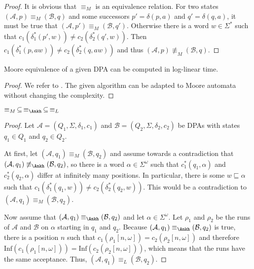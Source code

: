 \begin{proof}
	It is obvious that $\equiv_M$ is an equivalence relation. For two states $(\mathcal{A}, p) \equiv_M (\mathcal{B}, q)$ and some successors $p' = \delta(p, a)$ and $q' = \delta(q, a)$, it must be true that $(\mathcal{A}, p') \equiv_M (\mathcal{B}, q')$. Otherwise there is a word $w \in \Sigma^*$ such that $c_1(\delta_1^*(p', w)) \neq c_2(\delta_2^*(q', w))$. Then $c_1(\delta_1^*(p, aw)) \neq c_2(\delta_2^*(q, aw))$ and thus $(\mathcal{A}, p) \not\equiv_M (\mathcal{B}, q)$.
\end{proof}

\begin{lem}
	Moore equivalence of a given DPA can be computed in log-linear time.
\end{lem}

\begin{proof}
	We refer to \cite{Hopcroft1971}. The given algorithm can be adapted to Moore automata without changing the complexity.
\end{proof}


\vspace{10pt}

\begin{theorem}
	$\equiv_M \,\subseteq\, \equiv_\text{\Ankh} \,\subseteq\, \equiv_L$
	\label{thm:general:M_subs_Ankh_subs_L}
\end{theorem}

\begin{proof}
	Let $\mathcal{A} = (Q_1, \Sigma, \delta_1, c_1)$ and $\mathcal{B} = (Q_2, \Sigma, \delta_2, c_2)$ be DPAs with states $q_1 \in Q_1$ and $q_2 \in Q_2$. 
	
	At first, let $(\mathcal{A}, q_1) \equiv_M (\mathcal{B}, q_2)$ and assume towards a contradiction that $(\mathcal{A}, q_1) \not\equiv_\text{\Ankh} (\mathcal{B}, q_2)$, so there is a word $\alpha \in \Sigma^\omega$ such that $c_1^*(q_1, \alpha)$ and $c_2^*(q_2, \alpha)$ differ at infinitely many positions. In particular, there is some $w \sqsubseteq \alpha$ such that $c_1(\delta_1^*(q_1, w)) \neq c_2(\delta_2^*(q_2, w))$. This would be a contradiction to $(\mathcal{A}, q_1) \equiv_M (\mathcal{B}, q_2)$.
	
	Now assume that $(\mathcal{A}, q_1) \equiv_\text{\Ankh} (\mathcal{B}, q_2)$ and let $\alpha \in \Sigma^\omega$. Let $\rho_1$ and $\rho_2$ be the runs of $\mathcal{A}$ and $\mathcal{B}$ on $\alpha$ starting in $q_1$ and $q_2$. Because $(\mathcal{A}, q_1) \equiv_\text{\Ankh} (\mathcal{B}, q_2)$ is true, there is a position $n$ such that $c_1(\rho_1[n,\omega]) = c_2(\rho_2[n,\omega])$ and therefore $\text{Inf}(c_1(\rho_1[n,\omega])) = \text{Inf}(c_2(\rho_2[n,\omega]))$, which means that the runs have the same acceptance. Thus, $(\mathcal{A}, q_1) \equiv_L (\mathcal{B}, q_2)$.
\end{proof}






